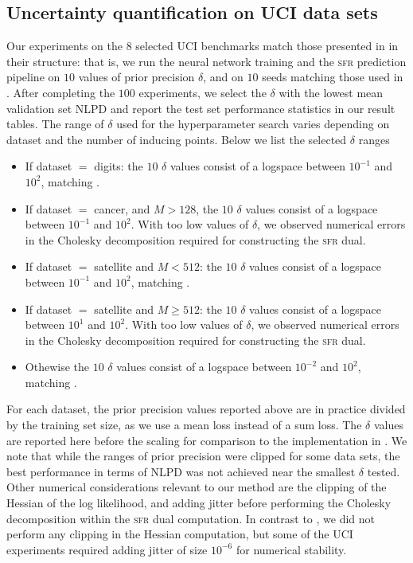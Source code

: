 \documentclass{article}
\newcommand{\our}{\textsc{sfr}\xspace}
\begin{document}
\subsection{Uncertainty quantification on UCI data sets}\label{app:uci}
Our experiments on the $8$ selected UCI benchmarks \cite{UCI} match those presented in \cite{immer2021improving} in their structure: that is, we run the neural network training and the \our prediction pipeline on $10$ values of prior precision $\delta$, and on $10$ seeds matching those used in \cite{immer2021improving}. After completing the $100$ experiments, we select the $\delta$ with the lowest mean validation set NLPD and report the test set performance statistics in our result tables. The range of $\delta$ used for the hyperparameter search varies depending on dataset and the number of inducing points. Below we list the selected $\delta$ ranges 
\begin{itemize}
\item If dataset $ = $ {\sc digits}: the $10$ $\delta$ values consist of a logspace between $10^{-1}$ and $10^2$, matching \citet{immer2021improving}.
\item If dataset $= $ {\sc cancer},  and $M > 128$, the $10$ $\delta$ values consist of a logspace between $10^{-1}$ and $10^2$. With too low values of $\delta$, we observed numerical errors in the Cholesky decomposition required for constructing the \our dual.
\item If dataset $=$ {\sc satellite} and $M < 512$: the $10$ $\delta$ values consist of a logspace between $10^{-1}$ and $10^2$, matching \citet{immer2021improving}.
\item If dataset $=$ {\sc satellite} and $M \geq 512$: the $10$ $\delta$ values consist of a logspace between $10^{1}$ and $10^2$.  With too low values of $\delta$, we observed numerical errors in the Cholesky decomposition required for constructing the \our dual.
\item Othewise  the $10$ $\delta$ values consist of a logspace between $10^{-2}$ and $10^2$, matching \citet{immer2021improving}.
\end{itemize}
For each dataset, the prior precision values reported above are in practice divided by the training set size, as we use a mean loss instead of a sum loss. The $\delta$ values are reported here before the scaling for comparison to the implementation in \citet{immer2021improving}.
We note that while the ranges of prior precision were clipped for some data sets, the best performance in terms of NLPD was not achieved near the smallest $\delta$ tested. Other numerical considerations relevant to our method are the clipping of the Hessian of the log likelihood, and adding jitter before performing the Cholesky decomposition within the \our dual computation. In contrast to \citet{immer2021improving}, we did not perform any clipping in the Hessian computation, but some of the UCI experiments required adding jitter of size $10^{-6}$ for numerical stability.  
\end{document}
